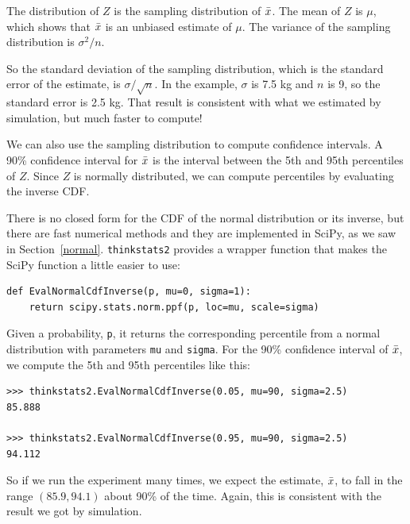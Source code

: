 \documentclass[12pt]{book}
\begin{document}
The distribution of $Z$ is the sampling distribution of $\bar{x}$.
The mean of $Z$ is $\mu$, which shows that $\bar{x}$ is an unbiased
estimate of $\mu$.  The variance of the sampling distribution
is $\sigma^2 / n$.

So the standard deviation of the sampling distribution, which is the
standard error of the estimate, is $\sigma / \sqrt{n}$.  In the
example, $\sigma$ is 7.5 kg and $n$ is 9, so the standard error is 2.5
kg.  That result is consistent with what we estimated by simulation,
but much faster to compute!

We can also use the sampling distribution to compute confidence
intervals.  A 90\% confidence interval for $\bar{x}$ is the interval
between the 5th and 95th percentiles of $Z$.  Since $Z$ is normally
distributed, we can compute percentiles by evaluating the inverse
CDF.

There is no closed form for the CDF of the normal distribution
or its inverse, but there are fast numerical methods and they
are implemented in SciPy, as we saw in Section~\ref{normal}.
\verb"thinkstats2" provides a wrapper function that makes the
SciPy function a little easier to use:

\begin{verbatim}
def EvalNormalCdfInverse(p, mu=0, sigma=1):
    return scipy.stats.norm.ppf(p, loc=mu, scale=sigma)
\end{verbatim}

Given a probability, \verb"p", it returns the corresponding
percentile from a normal distribution with parameters \verb"mu"
and \verb"sigma".  For the 90\% confidence interval of $\bar{x}$,
we compute the 5th and 95th percentiles like this:

\begin{verbatim}
>>> thinkstats2.EvalNormalCdfInverse(0.05, mu=90, sigma=2.5)
85.888

>>> thinkstats2.EvalNormalCdfInverse(0.95, mu=90, sigma=2.5)
94.112
\end{verbatim}

So if we run the experiment many times, we expect the
estimate, $\bar{x}$, to fall in the range $(85.9, 94.1)$ about
90\% of the time.  Again, this is consistent with the result
we got by simulation.
\end{document}
